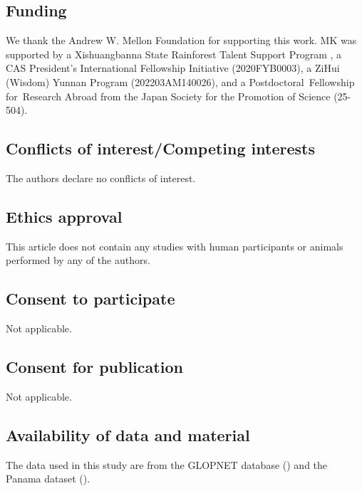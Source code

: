 \documentclass[
  12pt,
  letterpaper,
  DIV=11,
  numbers=noendperiod]{scrartcl}
\providecommand{\DIFadd}[1]{{\protect\color{blue}\uwave{#1}}} %
\providecommand{\DIFaddbegin}{} %
\providecommand{\DIFaddend}{} %
\newcommand{\DIFaddincludegraphics}[2][]{{\color{blue}\fbox{\DIFOincludegraphics[#1]{#2}}}} %
\DeclareRobustCommand{\DIFaddbegin}{\DIFOaddbegin \let\includegraphics\DIFaddincludegraphics} %
\DeclareRobustCommand{\DIFaddend}{\DIFOaddend \let\includegraphics\DIFOincludegraphics} %
\begin{document}
\subsection{Funding}\label{funding}

We thank the Andrew W. Mellon Foundation for supporting this work. MK
was supported by a Xishuangbanna State Rainforest Talent Support Program
\DIFaddbegin \DIFadd{(E4BN041B01)}\DIFaddend , a CAS President's International Fellowship Initiative
(2020FYB0003), a ZiHui (Wisdom) Yunnan Program (202203AM140026), and a
Postdoctoral~Fellowship for~Research Abroad from the Japan Society for
the Promotion of Science (25-504).

\subsection{Conflicts of interest/Competing
interests}\label{conflicts-of-interestcompeting-interests}

The authors declare no conflicts of interest.

\subsection{Ethics approval}\label{ethics-approval}

This article does not contain any studies with human participants or
animals performed by any of the authors.

\subsection{Consent to participate}\label{consent-to-participate}

Not applicable.

\subsection{Consent for publication}\label{consent-for-publication}

Not applicable.

\subsection{Availability of data and
material}\label{availability-of-data-and-material}

The data used in this study are from the GLOPNET database
() and the Panama dataset
().
\end{document}
